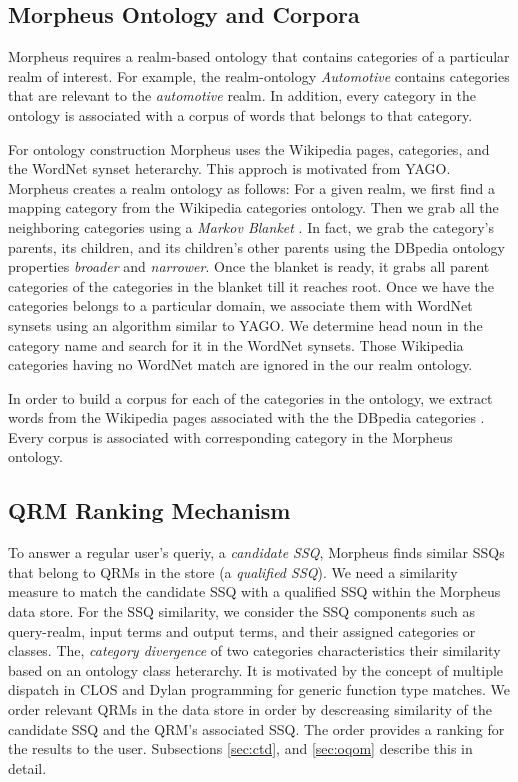 \subsection{Morpheus Ontology and Corpora} 

Morpheus requires a realm-based ontology that contains categories of a
particular realm of interest. For example, the realm-ontology \textit{Automotive}
contains categories that are relevant to the \textit{automotive} realm. In
addition, every category in the ontology is associated with a corpus of words
that belongs to that category.   

For ontology construction Morpheus uses the Wikipedia pages, categories,
and the WordNet synset heterarchy. This approch is motivated from
YAGO\cite{Suchanek2009phd}. Morpheus creates a realm ontology as follows: For a
given realm, we first find a mapping category from the Wikipedia categories 
ontology. Then we grab all the neighboring categories
using a \textit{Markov Blanket} \cite{PRIS}. In fact, we grab 
the category's parents, its children, and its 
children's other parents using the DBpedia ontology properties \textit{broader}
and \textit{narrower}. Once the blanket is ready, it grabs all parent categories
of the categories in the blanket till it reaches root. Once we have the
categories belongs to a particular domain, we associate them with WordNet synsets
using an algorithm similar to YAGO. We determine head noun in the
category name and search for it in the WordNet synsets\cite{Suchanek2009phd}.
Those Wikipedia categories having no WordNet match are ignored in the our realm
ontology.   

In order to build a corpus for each of the categories in the ontology, 
we extract words from the Wikipedia pages associated with the 
the DBpedia categories \cite{Auer07dbpedia:a}. Every corpus is associated 
with corresponding category in the Morpheus ontology.  

\subsection{QRM Ranking Mechanism} 

To answer a regular user's queriy, a \textit{candidate
SSQ}, Morpheus finds similar SSQs that belong to QRMs in the store (a
\textit{qualified SSQ}). We need a similarity measure to match the candidate SSQ
with a qualified SSQ within the Morpheus data store. For the SSQ similarity, we
consider the SSQ components such as query-realm, input
terms and output terms, and their assigned categories or classes. The,
\textit{category divergence} of two categories characteristics their 
similarity based on an ontology class heterarchy. 
It is motivated by the concept of multiple
dispatch in CLOS \cite{Steele1990} and Dylan programming \cite{Barrett1996} for
generic function type matches. We order relevant QRMs in the data store 
in order by descreasing similarity of the candidate SSQ and the QRM's associated SSQ.   
The order provides a ranking for the results to the
user. Subsections \ref{sec:ctd}, and \ref{sec:oqom} describe this in detail.

